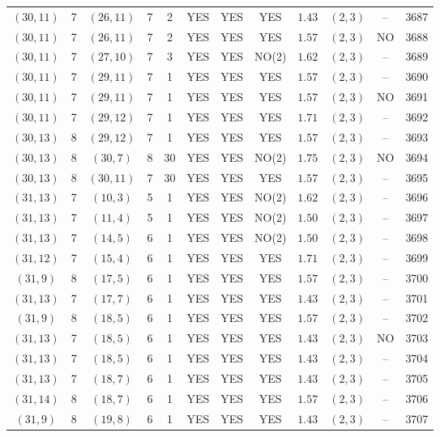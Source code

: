 \begin{longtable}{|c|c|c|c|c|c|c|c|c|c|c|c|}
$(30,11)$ & 7 & $(26,11)$ & 7 & 2 & YES & YES & YES & $1.43$ & $(2,3)$ & -- & 3687\\
$(30,11)$ & 7 & $(26,11)$ & 7 & 2 & YES & YES & YES & $1.57$ & $(2,3)$ & NO & 3688\\
$(30,11)$ & 7 & $(27,10)$ & 7 & 3 & YES & YES & NO(2) & $1.62$ & $(2,3)$ & -- & 3689\\
$(30,11)$ & 7 & $(29,11)$ & 7 & 1 & YES & YES & YES & $1.57$ & $(2,3)$ & -- & 3690\\
$(30,11)$ & 7 & $(29,11)$ & 7 & 1 & YES & YES & YES & $1.57$ & $(2,3)$ & NO & 3691\\
$(30,11)$ & 7 & $(29,12)$ & 7 & 1 & YES & YES & YES & $1.71$ & $(2,3)$ & -- & 3692\\
$(30,13)$ & 8 & $(29,12)$ & 7 & 1 & YES & YES & YES & $1.57$ & $(2,3)$ & -- & 3693\\
$(30,13)$ & 8 & $(30,7)$ & 8 & 30 & YES & YES & NO(2) & $1.75$ & $(2,3)$ & NO & 3694\\
$(30,13)$ & 8 & $(30,11)$ & 7 & 30 & YES & YES & YES & $1.57$ & $(2,3)$ & -- & 3695\\
$(31,13)$ & 7 & $(10,3)$ & 5 & 1 & YES & YES & NO(2) & $1.62$ & $(2,3)$ & -- & 3696\\
$(31,13)$ & 7 & $(11,4)$ & 5 & 1 & YES & YES & NO(2) & $1.50$ & $(2,3)$ & -- & 3697\\
$(31,13)$ & 7 & $(14,5)$ & 6 & 1 & YES & YES & NO(2) & $1.50$ & $(2,3)$ & -- & 3698\\
$(31,12)$ & 7 & $(15,4)$ & 6 & 1 & YES & YES & YES & $1.71$ & $(2,3)$ & -- & 3699\\
$(31,9)$ & 8 & $(17,5)$ & 6 & 1 & YES & YES & YES & $1.57$ & $(2,3)$ & -- & 3700\\
$(31,13)$ & 7 & $(17,7)$ & 6 & 1 & YES & YES & YES & $1.43$ & $(2,3)$ & -- & 3701\\
$(31,9)$ & 8 & $(18,5)$ & 6 & 1 & YES & YES & YES & $1.57$ & $(2,3)$ & -- & 3702\\
$(31,13)$ & 7 & $(18,5)$ & 6 & 1 & YES & YES & YES & $1.43$ & $(2,3)$ & NO & 3703\\
$(31,13)$ & 7 & $(18,5)$ & 6 & 1 & YES & YES & YES & $1.43$ & $(2,3)$ & -- & 3704\\
$(31,13)$ & 7 & $(18,7)$ & 6 & 1 & YES & YES & YES & $1.43$ & $(2,3)$ & -- & 3705\\
$(31,14)$ & 8 & $(18,7)$ & 6 & 1 & YES & YES & YES & $1.57$ & $(2,3)$ & -- & 3706\\
$(31,9)$ & 8 & $(19,8)$ & 6 & 1 & YES & YES & YES & $1.43$ & $(2,3)$ & -- & 3707\\

\end{longtable}
